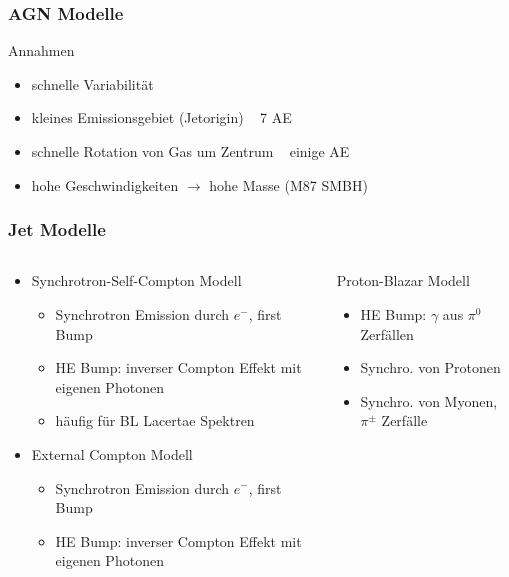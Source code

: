 \documentclass[aspectratio=1610, 9pt]{beamer}
\begin{document}
\begin{frame}\frametitle{AGN Modelle}
  \begin{block}{Annahmen}
    \begin{itemize}
      \item schnelle Variabilit\"at
      \item kleines Emissionsgebiet (Jetorigin) ~ 7 AE
      \item schnelle Rotation von Gas um Zentrum ~ einige AE
      \item hohe Geschwindigkeiten $\to$ hohe Masse (M87 SMBH) 
    \end{itemize}
  \end{block}
\end{frame}

\begin{frame}\frametitle{Jet Modelle}
  \begin{columns}
  \begin{column}[c]{0.45\linewidth}
  \begin{itemize}
    \item Synchrotron-Self-Compton Modell
    \begin{itemize}
      \item Synchrotron Emission durch $e^{-}$, first Bump
      \item HE Bump: inverser Compton Effekt mit eigenen Photonen
      \item h\"aufig f\"ur BL Lacertae Spektren
    \end{itemize}
    \item External Compton Modell
    \begin{itemize}
      \item Synchrotron Emission durch $e^{-}$, first Bump
      \item HE Bump: inverser Compton Effekt mit eigenen Photonen
    \end{itemize}
  \end{itemize}
  \end{column}
  \begin{column}{0.45\linewidth}
    \begin{block}{Proton-Blazar Modell}
    \begin{itemize}
      \item HE Bump: $\gamma$ aus $\pi^{0}$ Zerf\"allen
      \item Synchro. von Protonen
      \item Synchro. von Myonen, $\pi^{\pm}$ Zerf\"alle
    \end{itemize}
    \end{block}
  \end{column}
  \end{columns}
\end{frame}
\end{document}
